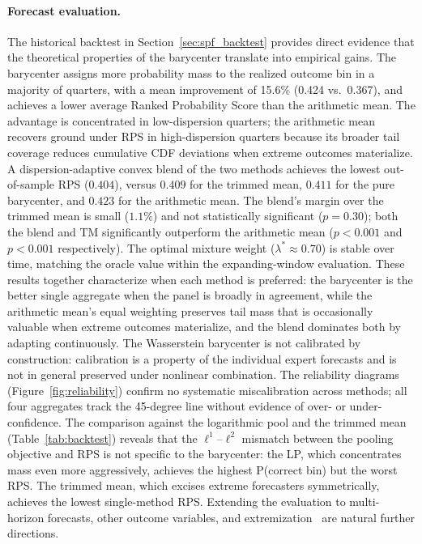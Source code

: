 \paragraph{Forecast evaluation.}  The historical backtest in Section~\ref{sec:spf_backtest} provides direct evidence that the theoretical properties of the barycenter translate into empirical gains.  The barycenter assigns more probability mass to the realized outcome bin in a majority of quarters, with a mean improvement of 15.6\% (0.424 vs.\ 0.367), and achieves a lower average Ranked Probability Score than the arithmetic mean.  The advantage is concentrated in low-dispersion quarters; the arithmetic mean recovers ground under RPS in high-dispersion quarters because its broader tail coverage reduces cumulative CDF deviations when extreme outcomes materialize.  A dispersion-adaptive convex blend of the two methods achieves the lowest out-of-sample RPS ($0.404$), versus $0.409$ for the trimmed mean, $0.411$ for the pure barycenter, and $0.423$ for the arithmetic mean.  The blend's margin over the trimmed mean is small ($1.1\%$) and not statistically significant ($p=0.30$); both the blend and TM significantly outperform the arithmetic mean ($p < 0.001$ and $p < 0.001$ respectively).  The optimal mixture weight ($\lambda^*\approx0.70$) is stable over time, matching the oracle value within the expanding-window evaluation.  These results together characterize when each method is preferred: the barycenter is the better single aggregate when the panel is broadly in agreement, while the arithmetic mean's equal weighting preserves tail mass that is occasionally valuable when extreme outcomes materialize, and the blend dominates both by adapting continuously.  The Wasserstein barycenter is not calibrated by construction: calibration is a property of the individual expert forecasts and is not in general preserved under nonlinear combination.  The reliability diagrams (Figure~\ref{fig:reliability}) confirm no systematic miscalibration across methods; all four aggregates track the 45-degree line without evidence of over- or under-confidence.  The comparison against the logarithmic pool and the trimmed mean (Table~\ref{tab:backtest}) reveals that the $\ell^1$--$\ell^2$ mismatch between the pooling objective and RPS is not specific to the barycenter: the LP, which concentrates mass even more aggressively, achieves the highest P(correct bin) but the worst RPS.  The trimmed mean, which excises extreme forecasters symmetrically, achieves the lowest single-method RPS.  Extending the evaluation to multi-horizon forecasts, other outcome variables, and extremization~\cite{satopaa14} are natural further directions.

